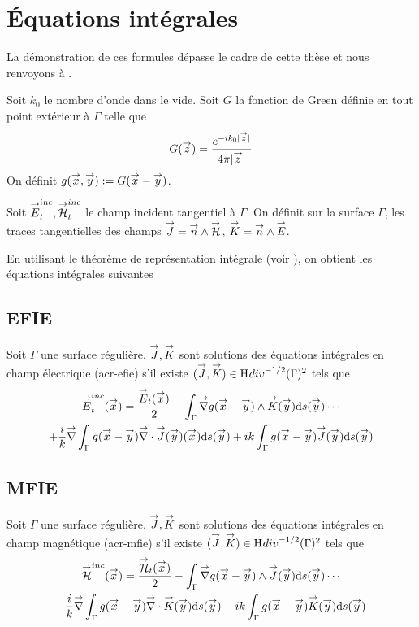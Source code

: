 \section{Équations intégrales}

    La démonstration de ces formules dépasse le cadre de cette thèse et nous renvoyons à \cite[\textsection~5.6]{nedelec_mixed_1980}.

    Soit \(k_0\) le nombre d'onde dans le vide. Soit \(G\) la fonction de Green définie en tout point extérieur à \(\Gamma\) telle que
    \begin{equation*}
      G(\vz) = \frac{e^{-ik_0|\vz|}}{4\pi|\vz|}
    \end{equation*}
    On définit \(g(\vx,\vy) := G(\vx - \vy)\).

    Soit \(\vE^{inc}_t,\vH^{inc}_t\) le champ incident tangentiel à \(\Gamma\). On définit sur la surface \(\Gamma\), les traces tangentielles des champs \(\vJ = \vn \pvect \vH\), \(\vK = \vn \pvect \vE\).

    En utilisant le théorème de représentation intégrale (voir \cite[Théorème 5.5.1]{nedelec_acoustic_2001}), on obtient les équations intégrales suivantes
    \subsection{EFIE}

      \begin{prop}
        \label{eq:form_int:EFIE}
        Soit \(\Gamma\) une surface régulière.
        \(\vJ,\vK\) sont solutions des équations intégrales en champ électrique (\gls{acr-efie}) s'il existe \((\vJ,\vK) \in \Hdiv^{-1/2}(\Gamma)^2\) tels que
        \begin{multline*}
          \vE^{inc}_t(\vx) =
            \frac{\vE_t(\vx)}{2}
              - \int_{\Gamma} \vgrad g(\vx - \vy) \pvect \vK(\vy) \dd{s}(\vy) \cdots \\
            + \frac{i}{k}\vgrad \int_{\Gamma}  g(\vx - \vy)\vdiv\vJ(\vy)(\vx) \dd{s}(\vy)
              +  ik\int_{\Gamma} g(\vx - \vy)\vJ(\vy) \dd{s}(\vy)
        \end{multline*}
      \end{prop}


    \subsection{MFIE}
      \begin{prop}
        \label{eq:form_int:MFIE}
        Soit \(\Gamma\) une surface régulière.
        \(\vJ,\vK\) sont solutions des équations intégrales en champ magnétique (\gls{acr-mfie}) s'il existe \((\vJ,\vK) \in \Hdiv^{-1/2}(\Gamma)^2\) tels que
        \begin{multline*}
          \vH^{inc}(\vx) =
          \frac{\vH_t(\vx)}{2}
            - \int_{\Gamma} \vgrad g(\vx - \vy) \pvect \vJ(\vy) \dd{s}(\vy) \cdots \\
          - \frac{i}{k} \vgrad \int_{\Gamma}  g(\vx - \vy)\vdiv\vK(\vy)\dd{s}(\vy)
            - ik \int_{\Gamma} g(\vx - \vy)\vK(\vy)\dd{s}(\vy)
        \end{multline*}
      \end{prop}

